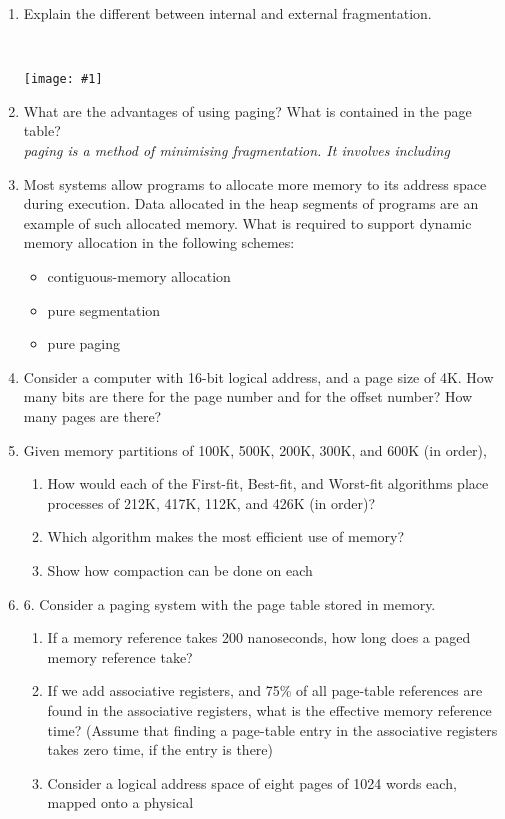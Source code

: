 \documentclass{article}
\newcommand{\answercolor}{Bittersweet}
\newcommand{\answer}[1]{{\\\color{\answercolor}\footnotesize\itshape{#1}}}
\newcommand{\answerimg}[1]{\answer{\begin{figure*}[h]\centering\texttt{[image: \#1]}\end{figure*}}}
\begin{document}
	\begin{enumerate}
		\item Explain the different between internal and external fragmentation.
        \answerimg{T6Q1}
		\item What are the advantages of using paging? What is contained in the page table?
        \answer{paging is a method of minimising fragmentation. It involves including }
		\item Most systems allow programs to allocate more memory to its address space during execution. Data allocated in the heap segments of programs are an example of such allocated memory. What is required to support dynamic memory allocation in the following schemes:
		\begin{itemize}
			\item contiguous-memory allocation
			\item pure segmentation
			\item pure paging
		\end{itemize}
		\item Consider a computer with 16-bit logical address, and a page size of 4K. How many bits are there for the page number and for the offset number? How many pages are there?
		\item Given memory partitions of 100K, 500K, 200K, 300K, and 600K (in order),
		\begin{enumerate}
			\item How would each of the First-fit, Best-fit, and Worst-fit algorithms place processes of 212K, 417K, 112K, and 426K (in order)?
			\item Which algorithm makes the most efficient use of memory?
			\item Show how compaction can be done on each
		\end{enumerate}
		\item 6. Consider a paging system with the page table stored in memory.
		\begin{enumerate}
			\item If a memory reference takes 200 nanoseconds, how long does a paged memory reference take?
			\item If we add associative registers, and 75\% of all page-table references are found in the associative registers, what is the effective memory reference time? (Assume that finding a page-table entry in the associative registers takes zero time, if the entry is there)
			\item Consider a logical address space of eight pages of 1024 words each, mapped onto a physical

\end{enumerate}
\end{enumerate}
\end{document}
